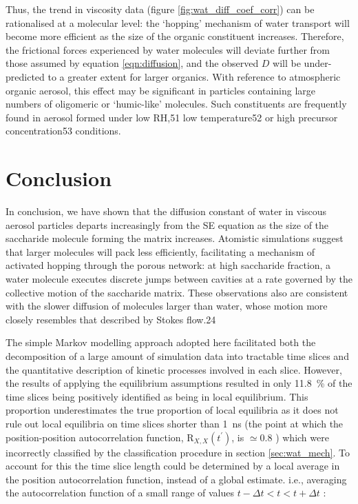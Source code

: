 Thus, the trend in viscosity data (figure \ref{fig:wat_diff_coef_corr}) can be rationalised at a molecular level: the `hopping’ mechanism of water transport will become more efficient as the size of the organic constituent increases. Therefore, the frictional forces experienced by water molecules will deviate further from those assumed by equation \ref{eqn:diffusion}, and the observed $D$ will be under-predicted to a greater extent for larger organics. With reference to atmospheric organic aerosol, this effect may be significant in particles containing large numbers of oligomeric or ‘humic-like’ molecules. Such constituents are frequently found in aerosol formed under low RH,51 low temperature52 or high precursor concentration53 conditions.

\section{Conclusion}\label{sec:wat_conclusions}
In conclusion, we have shown that the diffusion constant of water in viscous aerosol particles departs increasingly from the SE equation as the size of the saccharide molecule forming the matrix increases. Atomistic simulations suggest that larger molecules will pack less efficiently, facilitating a mechanism of activated hopping through the porous network: at high saccharide fraction, a water molecule executes discrete jumps between cavities at a rate governed by the collective motion of the saccharide matrix. These observations also are consistent with the slower diffusion of molecules larger than water, whose motion more closely resembles that described by Stokes flow.24

The simple Markov modelling approach adopted here facilitated both the decomposition of a large amount of simulation data into tractable time slices and the quantitative description of kinetic processes involved in each slice. However, the results of applying the equilibrium assumptions resulted in only \SI{11.8}{\percent} of the time slices being  positively identified as being in local equilibrium. This proportion underestimates the true proportion of local equilibria as it does not rule out local equilibria on time slices shorter than \SI{1}{\nano\second} (the point at which the position-position autocorrelation function, $\mathrm{R}_{X,  X}(t^{\prime})$, is $\simeq 0.8$ ) which were incorrectly classified by the classification procedure in section \ref{sec:wat_mech}.  To account for this the time slice length could be determined by a local average in the  position autocorrelation function, instead of a global estimate. i.e., averaging the autocorrelation function of a small range of values $t-\Delta t < t < t+\Delta t$ :

